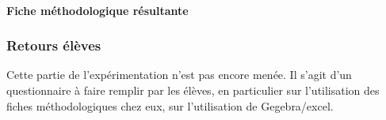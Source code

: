 \paragraph{Fiche méthodologique résultante}

\subsubsection{Retours élèves}

Cette partie de l'expérimentation n'est pas encore menée. Il s'agit d'un questionnaire à faire remplir par les élèves, en particulier sur l'utilisation des fiches méthodologiques chez eux, sur l'utilisation de Gegebra/excel.